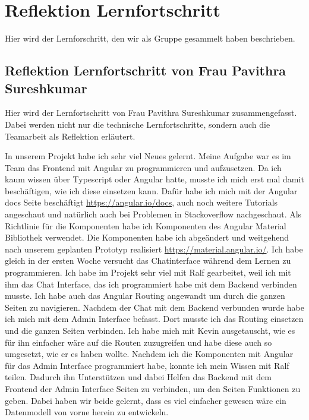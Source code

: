 \section{Reflektion Lernfortschritt}
Hier wird der Lernforschritt, den wir als Gruppe gesammelt haben beschrieben.

\subsection{Reflektion Lernfortschritt von Frau Pavithra Sureshkumar}
Hier wird der Lernfortschritt von Frau Pavithra Sureshkumar zusammengefasst. Dabei werden nicht nur die technische Lernfortschritte, sondern auch die Teamarbeit als Reflektion erläutert.\newline

\noindent In unserem Projekt habe ich sehr viel Neues gelernt. Meine Aufgabe war es im Team das Frontend mit Angular zu programmieren und aufzusetzen.
Da ich kaum wissen über Typescript oder Angular hatte, musste ich mich erst mal damit beschäftigen, wie ich diese einsetzen kann. Dafür habe ich mich mit der 
Angular docs Seite beschäftigt \href{https://angular.io/docs}{https://angular.io/docs}, auch noch weitere Tutorials angeschaut und natürlich auch bei Problemen in Stackoverflow nachgeschaut. 
Als Richtlinie für die Komponenten habe ich Komponenten des Angular Material Bibliothek verwendet. 
Die Komponenten habe ich abgeändert und weitgehend nach unserem geplanten Prototyp realisiert \href{https://material.angular.io/}{https://material.angular.io/}. 
Ich habe gleich in der ersten Woche versucht das Chatinterface während dem Lernen zu programmieren.
Ich habe im Projekt sehr viel mit Ralf gearbeitet, weil ich mit ihm das Chat Interface, das ich programmiert habe mit dem Backend verbinden musste. Ich habe auch das Angular Routing angewandt um durch die ganzen
Seiten zu navigieren. Nachdem der Chat mit dem Backend verbunden wurde habe ich mich mit dem Admin Interface befasst. Dort musste ich das Routing einsetzen und die ganzen Seiten verbinden.
Ich habe mich mit Kevin ausgetauscht, wie es für ihn einfacher wäre auf die Routen zuzugreifen und habe diese auch so umgesetzt, wie er es haben wollte.
Nachdem ich die Komponenten mit Angular für das Admin Interface programmiert habe, konnte ich mein Wissen mit Ralf teilen. 
Dadurch ihn Unterstützen und dabei Helfen das Backend mit dem Frontend der Admin Interface Seiten zu verbinden, um den Seiten Funktionen zu geben.
Dabei haben wir beide gelernt, dass es viel einfacher gewesen wäre ein Datenmodell von vorne herein zu entwickeln. 
